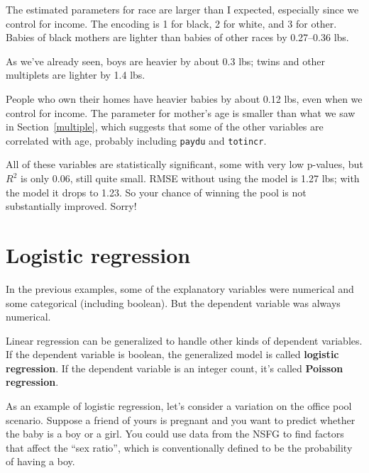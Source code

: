 \documentclass[12pt]{book}
\begin{document}
The estimated parameters for race are larger than I expected,
especially since we control for income.  The encoding
is 1 for black, 2 for white, and 3 for other.  Babies of black
mothers are lighter than babies of other races by 0.27--0.36 lbs.

As we've already seen, boys are heavier by about 0.3 lbs;
twins and other multiplets are lighter by 1.4 lbs.

People who own their homes have heavier babies by about 0.12 lbs,
even when we control for income.  The parameter for mother's
age is smaller than what we saw in Section~\ref{multiple}, which
suggests that some of the other variables are correlated with
age, probably including {\tt paydu} and {\tt totincr}.

All of these variables are statistically significant, some with
very low p-values, but 
$R^2$ is only 0.06, still quite small.
RMSE without using the model is 1.27 lbs; with the model it drops
to 1.23.  So your chance of winning the pool is not substantially
improved.  Sorry!
   



\section{Logistic regression}

In the previous examples, some of the explanatory variables were
numerical and some categorical (including boolean).  But the dependent
variable was always numerical.

Linear regression can be generalized to handle other kinds of
dependent variables.  If the dependent variable is boolean, the
generalized model is called {\bf logistic regression}.  If the dependent
variable is an integer count, it's called {\bf Poisson
regression}.

As an example of logistic regression, let's consider a variation
on the office pool scenario.
Suppose
a friend of yours is pregnant and you want to predict whether the
baby is a boy or a girl.  You could use data from the NSFG to find
factors that affect the ``sex ratio'', which is conventionally
defined to be the probability
of having a boy.
\end{document}
